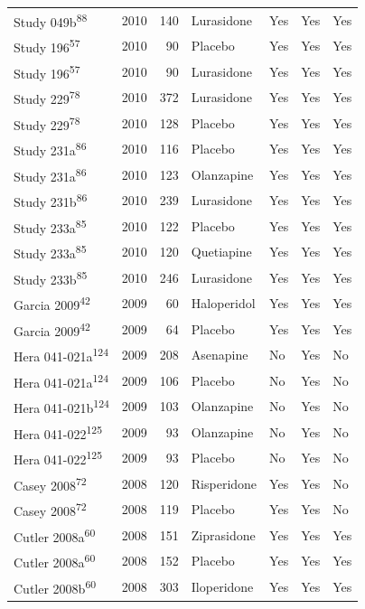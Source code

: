 \documentclass[
  9pt,
  english,
  ,jou,floatsintext]{apa6}
\begin{document}
\begin{longtable}[]{@{}lrrllll@{}}
Study 049b\textsuperscript{88} & 2010 & 140 & Lurasidone & Yes & Yes & Yes \\
Study 196\textsuperscript{57} & 2010 & 90 & Placebo & Yes & Yes & Yes \\
Study 196\textsuperscript{57} & 2010 & 90 & Lurasidone & Yes & Yes & Yes \\
Study 229\textsuperscript{78} & 2010 & 372 & Lurasidone & Yes & Yes & Yes \\
Study 229\textsuperscript{78} & 2010 & 128 & Placebo & Yes & Yes & Yes \\
Study 231a\textsuperscript{86} & 2010 & 116 & Placebo & Yes & Yes & Yes \\
Study 231a\textsuperscript{86} & 2010 & 123 & Olanzapine & Yes & Yes & Yes \\
Study 231b\textsuperscript{86} & 2010 & 239 & Lurasidone & Yes & Yes & Yes \\
Study 233a\textsuperscript{85} & 2010 & 122 & Placebo & Yes & Yes & Yes \\
Study 233a\textsuperscript{85} & 2010 & 120 & Quetiapine & Yes & Yes & Yes \\
Study 233b\textsuperscript{85} & 2010 & 246 & Lurasidone & Yes & Yes & Yes \\
Garcia 2009\textsuperscript{42} & 2009 & 60 & Haloperidol & Yes & Yes & Yes \\
Garcia 2009\textsuperscript{42} & 2009 & 64 & Placebo & Yes & Yes & Yes \\
Hera 041-021a\textsuperscript{124} & 2009 & 208 & Asenapine & No & Yes & No \\
Hera 041-021a\textsuperscript{124} & 2009 & 106 & Placebo & No & Yes & No \\
Hera 041-021b\textsuperscript{124} & 2009 & 103 & Olanzapine & No & Yes & No \\
Hera 041-022\textsuperscript{125} & 2009 & 93 & Olanzapine & No & Yes & No \\
Hera 041-022\textsuperscript{125} & 2009 & 93 & Placebo & No & Yes & No \\
Casey 2008\textsuperscript{72} & 2008 & 120 & Risperidone & Yes & Yes & No \\
Casey 2008\textsuperscript{72} & 2008 & 119 & Placebo & Yes & Yes & No \\
Cutler 2008a\textsuperscript{60} & 2008 & 151 & Ziprasidone & Yes & Yes & Yes \\
Cutler 2008a\textsuperscript{60} & 2008 & 152 & Placebo & Yes & Yes & Yes \\
Cutler 2008b\textsuperscript{60} & 2008 & 303 & Iloperidone & Yes & Yes & Yes \\

\end{longtable}
\end{document}
